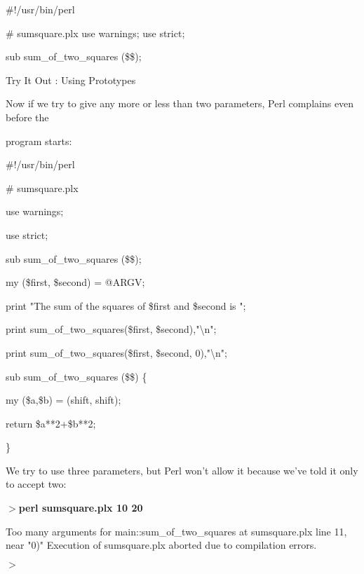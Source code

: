 \documentclass[a4paper,11pt]{book}
\begin{document}
\noindent 

\noindent \#!/usr/bin/perl

\noindent \# sumsquare.plx use warnings; use strict;

\noindent sub sum\_of\_two\_squares (\$\$);

\noindent 

\noindent 

\noindent Try It Out : Using Prototypes

\noindent 

\noindent Now  if we try to  give any more  or less  than  two  parameters,  Perl  complains  even  before  the

\noindent program starts:

\noindent 

\noindent \#!/usr/bin/perl

\noindent \# sumsquare.plx

\noindent use warnings;

\noindent use strict;

\noindent sub sum\_of\_two\_squares (\$\$);

\noindent 

\noindent my (\$first, \$second) = @ARGV;

\noindent print "The sum of the squares of \$first and \$second is ";

\noindent print sum\_of\_two\_squares(\$first, \$second),"\textbackslash n";

\noindent 

\noindent print sum\_of\_two\_squares(\$first, \$second, 0),"\textbackslash n";

\noindent 

\noindent sub sum\_of\_two\_squares (\$\$) \{

\noindent my (\$a,\$b) = (shift, shift);

\noindent return \$a**2+\$b**2;

\noindent \}

\noindent 

\noindent We try to use three parameters, but Perl won't allow it because we've told it only to accept two:

\noindent 

\noindent $>$\textbf{perl sumsquare.plx 10 20}

\noindent Too many arguments for main::sum\_of\_two\_squares at sumsquare.plx line 11, near "0)" Execution of sumsquare.plx aborted due to compilation errors.

\noindent $>$
\end{document}
